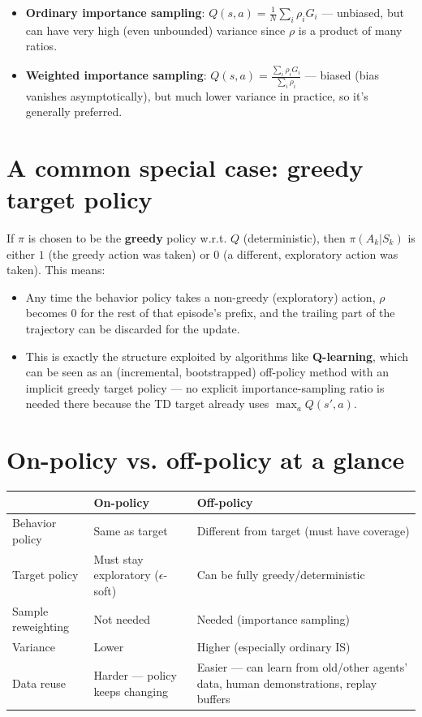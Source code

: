 \documentclass[11pt]{article}
\begin{document}
\begin{itemize}
    \item \textbf{Ordinary importance sampling}: $Q(s,a) = \frac{1}{N}\sum_i \rho_i G_i$ --- unbiased, but can have very high (even unbounded) variance since $\rho$ is a product of many ratios.
    \item \textbf{Weighted importance sampling}: $Q(s,a) = \frac{\sum_i \rho_i G_i}{\sum_i \rho_i}$ --- biased (bias vanishes asymptotically), but much lower variance in practice, so it's generally preferred.
\end{itemize}

\section*{A common special case: greedy target policy}

If $\pi$ is chosen to be the \textbf{greedy} policy w.r.t. $Q$ (deterministic), then $\pi(A_k|S_k)$ is either $1$ (the greedy action was taken) or $0$ (a different, exploratory action was taken). This means:

\begin{itemize}
    \item Any time the behavior policy takes a non-greedy (exploratory) action, $\rho$ becomes $0$ for the rest of that episode's prefix, and the trailing part of the trajectory can be discarded for the update.
    \item This is exactly the structure exploited by algorithms like \textbf{Q-learning}, which can be seen as an (incremental, bootstrapped) off-policy method with an implicit greedy target policy --- no explicit importance-sampling ratio is needed there because the TD target already uses $\max_a Q(s', a)$.
\end{itemize}

\section*{On-policy vs. off-policy at a glance}

\begin{center}
\begin{tabularx}{\textwidth}{|l|X|X|}
\hline
 & \textbf{On-policy} & \textbf{Off-policy} \\
\hline
Behavior policy & Same as target & Different from target (must have coverage) \\
\hline
Target policy & Must stay exploratory ($\epsilon$-soft) & Can be fully greedy/deterministic \\
\hline
Sample reweighting & Not needed & Needed (importance sampling) \\
\hline
Variance & Lower & Higher (especially ordinary IS) \\
\hline
Data reuse & Harder --- policy keeps changing & Easier --- can learn from old/other agents' data, human demonstrations, replay buffers \\
\hline
\end{tabularx}
\end{center}
\end{document}
